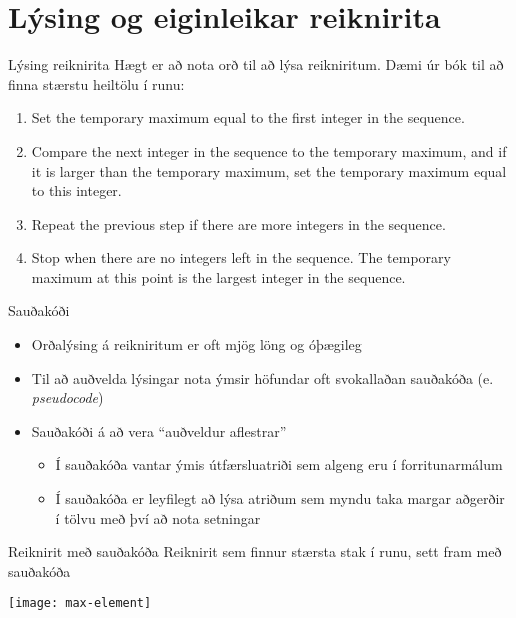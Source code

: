 \documentclass[handout]{beamer}
\begin{document}
\section{Lýsing og eiginleikar reiknirita}

\begin{frame}{Lýsing reiknirita}
Hægt er að nota orð til að lýsa reikniritum. Dæmi úr bók til að finna stærstu heiltölu í runu:

\begin{enumerate}
 \item Set the temporary maximum equal to the first integer in the sequence.
 \item Compare the next integer in the sequence to the temporary maximum, and if it is larger
than the temporary maximum, set the temporary maximum equal to this integer.
 \item Repeat the previous step if there are more integers in the sequence.
 \item Stop when there are no integers left in the sequence. The temporary maximum at this
point is the largest integer in the sequence.
\end{enumerate}
\end{frame}

\begin{frame}{Sauðakóði}
\begin{itemize}
 \item Orðalýsing á reikniritum er oft mjög löng og óþægileg
 \item Til að auðvelda lýsingar nota ýmsir höfundar oft svokallaðan sauðakóða (e. \emph{pseudocode})
 \item Sauðakóði á að vera ``auðveldur aflestrar''
 \begin{itemize}
  \item Í sauðakóða vantar ýmis útfærsluatriði sem algeng eru í forritunarmálum
  \item Í sauðakóða er leyfilegt að lýsa atriðum sem myndu taka margar aðgerðir í tölvu með því að nota setningar
 \end{itemize}
\end{itemize}
\end{frame}

\begin{frame}{Reiknirit með sauðakóða}
Reiknirit sem finnur stærsta stak í runu, sett fram með sauðakóða

\texttt{[image: max-element]}
\end{frame}
\end{document}
